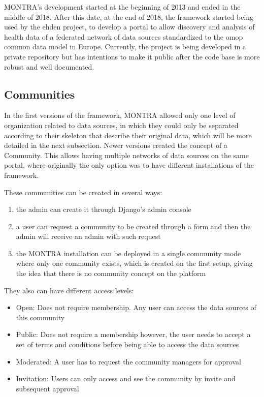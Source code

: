 MONTRA's development started at the beginning of 2013 and ended in the middle of 2018.
After this date, at the end of 2018, the framework started being used by the \gls{ehden} project, to develop a portal to allow discovery and analysis of health data of a federated network of data sources standardized to the \gls{omop} common data model in Europe.
Currently, the project is being developed in a private repository but has intentions to make it public after the code base is more robust and well documented.

\subsection{Communities}

In the first versions of the framework, MONTRA allowed only one level of organization related to data sources, in which they could only be separated according to their skeleton that describe their original data, which will be more detailed in the next subsection.
Newer versions created the concept of a Community.
This allows having multiple networks of data sources on the same portal, where originally the only option was to have different installations of the framework.

These communities can be created in several ways:

\begin{enumerate}
    \item the admin can create it through Django's admin console
    \item a user can request a community to be created through a form and then the admin will receive an admin with such request
    \item the MONTRA installation can be deployed in a single community mode where only one community exists, which is created on the first setup, giving the idea that there is no community concept on the platform
\end{enumerate}

They also can have different access levels:

\begin{itemize}
    \item Open: Does not require membership. Any user can access the data sources of this community
    \item Public: Does not require a membership however, the user needs to accept a set of terms and conditions before being able to access the data sources
    \item Moderated: A user has to request the community managers for approval
    \item Invitation: Users can only access and see the community by invite and subsequent approval
\end{itemize}

